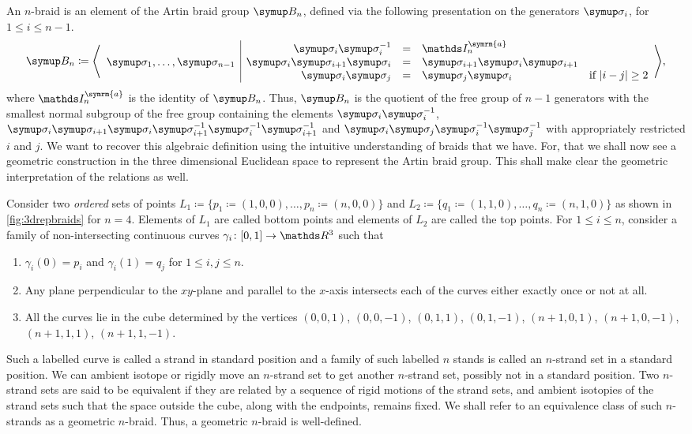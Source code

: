 An \(n\)-braid is an element of the Artin braid group \(\B_n\), defined via the following presentation on the generators \(\sigmaa_i\), for \(1 \leq i \leq n-1 \).
\[\B_n \coloneq\Biggl\langle
\begin{array}{c|rcll}
	& \sigmaa_i \sigmaa_i^{-1} &=& \symbb{I}_n^{\symrm{a}} &\\
	\sigmaa_1,\ldots, \sigmaa_{n-1} & \sigmaa_i \sigmaa_{i+1} \sigmaa_i &=& \sigmaa_{i+1} \sigmaa_i \sigmaa_{i+1} &\\
	& \sigmaa_i \sigmaa_j &=& \sigmaa_j \sigmaa_i &\text{if } \abs{i-j} \geq 2
\end{array}
\Biggr\rangle,\] where \(\symbb{I}_n^{\symrm{a}}\) is the identity of \(\B_n\).
Thus, \(\B_n\) is the quotient of the free group of \(n-1\) generators with the smallest normal subgroup of the free group containing the elements \(\sigmaa_i \sigmaa_i^{-1}\), \(\sigmaa_i \sigmaa_{i+1} \sigmaa_i \sigmaa_{i+1}^{-1} \sigmaa_i^{-1} \sigmaa_{i+1}^{-1}\) and \(\sigmaa_i \sigmaa_j \sigmaa_i^{-1} \sigmaa_{j}^{-1}\) with appropriately restricted \(i\) and \(j\). We want to recover this algebraic definition using the intuitive understanding of braids that we have. For, that we shall now see a geometric construction in the three dimensional Euclidean space to represent the Artin braid group. This shall make clear the geometric interpretation of the relations as well.

Consider two \textit{ordered} sets of points \(L_1 \coloneq \{p_1 \coloneq (1,0,0),\ldots, p_n \coloneq (n,0,0)\}\) and \(L_2 \coloneq \{q_1 \coloneq (1,1,0),\ldots, q_n \coloneq (n,1,0)\}\) as shown in \cref{fig:3drepbraids} for \(n=4\). Elements of \(L_1\) are called bottom points and elements of \(L_2\) are called the top points. For \(1 \leq i \leq n\), consider a family of non-intersecting continuous curves \(\gamma_i \colon [0, 1] \rightarrow \rthree\) such that
\begin{enumerate}
	\item \(\gamma_i (0) = p_i\) and \(\gamma_i (1) = q_j\) for \(1 \leq i, j \leq n\).
	\item Any plane perpendicular to the \(xy\)-plane and parallel to the \(x\)-axis intersects each of the curves either exactly once or not at all.
	\item All the curves lie in the cube determined by the vertices \((0,0,1)\), \((0,0,-1)\), \((0,1,1)\), \((0,1,-1)\), \((n+1,0,1)\), \((n+1,0,-1)\), \((n+1,1,1)\), \((n+1,1,-1)\).
\end{enumerate}
Such a labelled curve is called a strand in standard position and a family of such labelled \(n\) stands is called an \(n\)-strand set in a standard position. We can ambient isotope or rigidly move an \(n\)-strand set to get another \(n\)-strand set, possibly not in a standard position. Two \(n\)-strand sets are said to be equivalent if they are related by a sequence of rigid motions of the strand sets, and ambient isotopies of the strand sets such that the space outside the cube, along with the endpoints, remains fixed. We shall refer to an equivalence class of such \(n\)-strands as a geometric \(n\)-braid. Thus, a geometric \(n\)-braid is well-defined.

